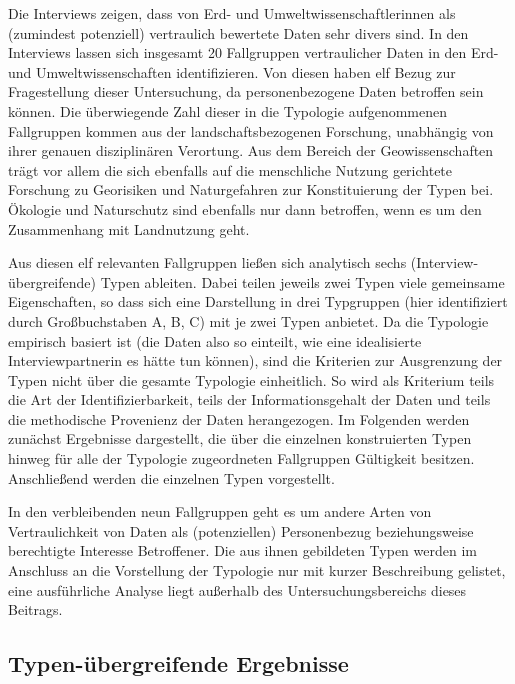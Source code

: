 \documentclass[a4paper,
fontsize=11pt,
oneside,
numbers=noperiodatend,
parskip=half-,
bibliography=totoc,
final
]{scrartcl}
\begin{document}
Die Interviews zeigen, dass von Erd- und Umweltwissenschaftlerinnen als
(zumindest potenziell) vertraulich bewertete Daten sehr divers sind. In
den Interviews lassen sich insgesamt 20 Fallgruppen vertraulicher Daten
in den Erd- und Umweltwissenschaften identifizieren. Von diesen haben
elf Bezug zur Fragestellung dieser Untersuchung, da personenbezogene
Daten betroffen sein können. Die überwiegende Zahl dieser in die
Typologie aufgenommenen Fallgruppen kommen aus der landschaftsbezogenen
Forschung, unabhängig von ihrer genauen disziplinären Verortung. Aus dem
Bereich der Geowissenschaften trägt vor allem die sich ebenfalls auf die
menschliche Nutzung gerichtete Forschung zu Georisiken und Naturgefahren
zur Konstituierung der Typen bei. Ökologie und Naturschutz sind
ebenfalls nur dann betroffen, wenn es um den Zusammenhang mit
Landnutzung geht.

Aus diesen elf relevanten Fallgruppen ließen sich analytisch sechs
(Interview-übergreifende) Typen ableiten. Dabei teilen jeweils zwei
Typen viele gemeinsame Eigenschaften, so dass sich eine Darstellung in
drei Typgruppen (hier identifiziert durch Großbuchstaben A, B, C) mit je
zwei Typen anbietet. Da die Typologie empirisch basiert ist (die Daten
also so einteilt, wie eine idealisierte Interviewpartnerin es hätte tun
können), sind die Kriterien zur Ausgrenzung der Typen nicht über die
gesamte Typologie einheitlich. So wird als Kriterium teils die Art der
Identifizierbarkeit, teils der Informationsgehalt der Daten und teils
die methodische Provenienz der Daten herangezogen. Im Folgenden werden
zunächst Ergebnisse dargestellt, die über die einzelnen konstruierten
Typen hinweg für alle der Typologie zugeordneten Fallgruppen Gültigkeit
besitzen. Anschließend werden die einzelnen Typen vorgestellt.

In den verbleibenden neun Fallgruppen geht es um andere Arten von
Vertraulichkeit von Daten als (potenziellen) Personenbezug
beziehungsweise berechtigte Interesse Betroffener. Die aus ihnen
gebildeten Typen werden im Anschluss an die Vorstellung der Typologie
nur mit kurzer Beschreibung gelistet, eine ausführliche Analyse liegt
außerhalb des Untersuchungsbereichs dieses Beitrags.

\hypertarget{typen-uxfcbergreifende-ergebnisse}{%
\subsection{Typen-übergreifende
Ergebnisse}\label{typen-uxfcbergreifende-ergebnisse}}
\end{document}

